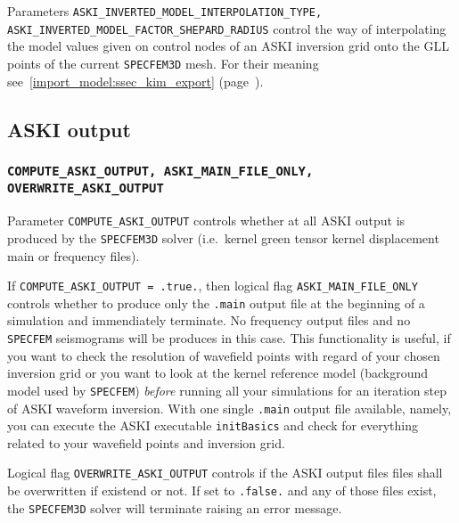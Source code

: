 \documentclass[12pt,a4paper]{article}
\newcommand{\lcode}[1]{\nolinkurl{#1}}
\newcommand{\lcodetitle}[1]{ {\ttfamily #1} }
\newcommand{\ASKI}{ {\ttfamily ASKI} }
\newcommand{\myref}[1]{\ref{#1} (page~\pageref{#1})}
\begin{document}
Parameters \lcode{ASKI_INVERTED_MODEL_INTERPOLATION_TYPE, ASKI_INVERTED_MODEL_FACTOR_SHEPARD_RADIUS} control the
way of interpolating the model values given on control nodes of an \ASKI{} inversion grid onto the GLL points of
the current \lcode{SPECFEM3D} mesh. For their meaning see~\myref{import_model:ssec_kim_export}.


\subsection{\lcodetitle{ASKI} output} \label{Par_file_ASKI,sub:output}
\subsubsection*{\lcode{COMPUTE_ASKI_OUTPUT, ASKI_MAIN_FILE_ONLY, OVERWRITE_ASKI_OUTPUT}}
Parameter \lcode{COMPUTE_ASKI_OUTPUT} controls whether at all \ASKI{} output is produced by the \lcode{SPECFEM3D} 
solver (i.e.\ kernel green tensor kernel displacement main or frequency files). 

If \lcode{COMPUTE_ASKI_OUTPUT = .true.}, then logical flag \lcode{ASKI_MAIN_FILE_ONLY} controls whether to
produce only the \lcode{.main} output file at the beginning of a simulation and immendiately terminate. No
frequency output files and no \lcode{SPECFEM} seismograms will be produces in this case. This functionality
is useful, if you want to check the resolution of wavefield points with regard of your chosen inversion grid 
or you want to look at the kernel reference model (background model used by \lcode{SPECFEM}) \emph{before}
running all your simulations for an iteration step of \ASKI{} waveform inversion. With one single \lcode{.main}
output file available, namely, you can execute the \ASKI{} executable \lcode{initBasics} and check for everything
related to your wavefield points and inversion grid.

Logical flag \lcode{OVERWRITE_ASKI_OUTPUT} controls if the \ASKI{} output files files shall be overwritten if 
existend or not. If set to \lcode{.false.} and any of those files exist, the \lcode{SPECFEM3D} solver will 
terminate raising an error message.
\end{document}
